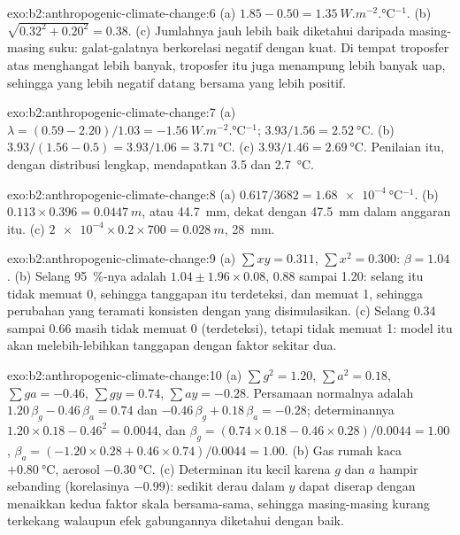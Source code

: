 \begin{solution}{exo:b2:anthropogenic-climate-change:6}
(a) $1.85 - 0.50 = \qty{1.35}{W.m^{-2}.\celsius^{-1}}$. (b) $\sqrt{0.32^2 + 0.20^2} = 0.38$.
(c) Jumlahnya jauh lebih baik diketahui daripada masing-masing suku: galat-galatnya berkorelasi negatif dengan kuat. Di tempat
troposfer atas menghangat lebih banyak, troposfer itu juga menampung lebih banyak uap, sehingga  yang lebih
negatif datang bersama  yang lebih positif.
\end{solution}

\begin{solution}{exo:b2:anthropogenic-climate-change:7}
(a) $\lambda = (0.59 - 2.20)/1.03 = \qty{-1.56}{W.m^{-2}.\celsius^{-1}}$; $3.93/1.56 =
\qty{2.52}{\celsius}$. (b) $3.93/(1.56 - 0.5) = 3.93/1.06 = \qty{3.71}{\celsius}$. (c) $3.93/1.46 =
\qty{2.69}{\celsius}$. Penilaian itu, dengan distribusi lengkap, mendapatkan 3.5 dan \qty{2.7}{\celsius}.
\end{solution}

\begin{solution}{exo:b2:anthropogenic-climate-change:8}
(a) $0.617/3682 = \qty{1.68e-4}{\celsius^{-1}}$. (b) $0.113 \times 0.396 = \qty{0.0447}{m}$, atau
\qty{44.7}{mm}, dekat dengan \qty{47.5}{mm} dalam anggaran itu. (c) $\num{2e-4} \times 0.2 \times 700 =
\qty{0.028}{m}$, \qty{28}{mm}.
\end{solution}

\begin{solution}{exo:b2:anthropogenic-climate-change:9}
(a) $\sum xy = 0.311$, $\sum x^2 = 0.300$: $\beta = 1.04$. (b) Selang \qty{95}{\percent}-nya adalah
$1.04 \pm 1.96 \times 0.08$, 0.88 sampai 1.20: selang itu tidak memuat 0, sehingga tanggapan itu terdeteksi, dan memuat
1, sehingga perubahan yang teramati konsisten dengan yang disimulasikan. (c) Selang 0.34 sampai 0.66 masih
tidak memuat 0 (terdeteksi), tetapi tidak memuat 1: model itu akan melebih-lebihkan tanggapan dengan faktor sekitar
dua.
\end{solution}

\begin{solution}{exo:b2:anthropogenic-climate-change:10}
(a) $\sum g^2 = 1.20$, $\sum a^2 = 0.18$, $\sum ga = -0.46$, $\sum gy = 0.74$, $\sum ay = -0.28$.
Persamaan normalnya adalah $1.20\,\beta_g - 0.46\,\beta_a = 0.74$ dan $-0.46\,\beta_g + 0.18\,\beta_a
= -0.28$; determinannya $1.20 \times 0.18 - 0.46^2 = 0.0044$, dan $\beta_g = (0.74 \times
0.18 - 0.46 \times 0.28)/0.0044 = 1.00$, $\beta_a = (-1.20 \times 0.28 + 0.46 \times 0.74)/0.0044 =
1.00$. (b) Gas rumah kaca $+\qty{0.80}{\celsius}$, aerosol $-\qty{0.30}{\celsius}$. (c) Determinan itu
kecil karena $g$ dan $a$ hampir sebanding (korelasinya $-0.99$): sedikit
derau dalam $y$ dapat diserap dengan menaikkan kedua faktor skala bersama-sama, sehingga masing-masing kurang
terkekang walaupun efek gabungannya diketahui dengan baik.
\end{solution}

